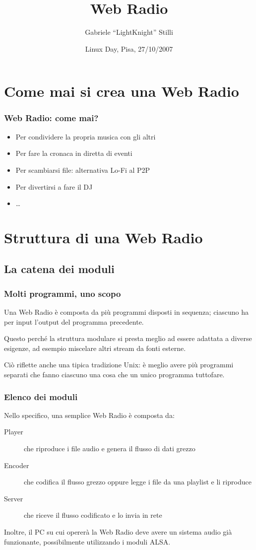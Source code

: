 \documentclass{beamer}
\title{Web Radio}
\author{Gabriele ``LightKnight'' Stilli}
\institute{G.U.L.P. -- Gruppo Utenti Linux Pisa}
\date{Linux Day, Pisa, 27/10/2007}
\begin{document}
\frame{\titlepage}

\frame{\tableofcontents}

\section{Come mai si crea una Web Radio}

\begin{frame}\frametitle{Web Radio: come mai?}
\begin{itemize}
\item Per condividere la propria musica con gli altri
\item Per fare la cronaca in diretta di eventi
\item Per scambiarsi file: alternativa Lo-Fi al P2P
\item Per divertirsi a fare il DJ
\item {\ldots}
\end{itemize}
\end{frame}

\section{Struttura di una Web Radio}

\subsection{La catena dei moduli}

\begin{frame}\frametitle{Molti programmi, uno scopo}
Una Web Radio è composta da più programmi disposti in sequenza;
ciascuno ha per input l'output del programma precedente.

Questo perché la struttura modulare si presta meglio ad essere
adattata a diverse esigenze, ad esempio miscelare altri stream da
fonti esterne.

Ciò riflette anche una tipica tradizione Unix: è meglio avere più
programmi separati che fanno ciascuno una cosa che un unico programma
tuttofare.

\end{frame}

\begin{frame}\frametitle{Elenco dei moduli}
Nello specifico, una semplice Web Radio è composta da:
\begin{description}
\item[Player] che riproduce i file audio e genera il flusso di dati
grezzo
\item[Encoder] che codifica il flusso grezzo oppure legge i file da
una playlist e li riproduce
\item[Server] che riceve il flusso codificato e lo invia in rete
\end{description}

Inoltre, il PC su cui opererà la Web Radio deve avere un sistema audio
già funzionante, possibilmente utilizzando i moduli ALSA.
\end{frame}
\end{document}
